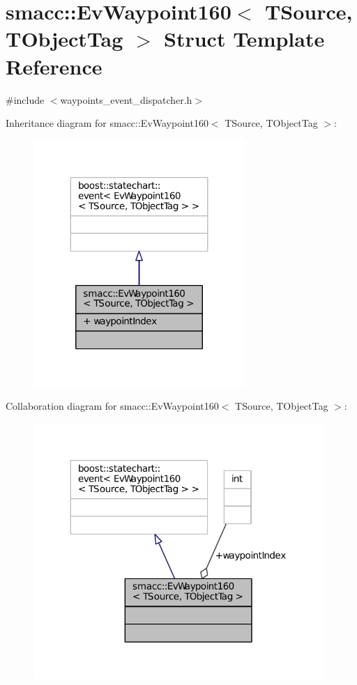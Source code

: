 \hypertarget{structsmacc_1_1EvWaypoint160}{}\section{smacc\+:\+:Ev\+Waypoint160$<$ T\+Source, T\+Object\+Tag $>$ Struct Template Reference}
\label{structsmacc_1_1EvWaypoint160}


{\ttfamily \#include $<$waypoints\+\_\+event\+\_\+dispatcher.\+h$>$}



Inheritance diagram for smacc\+:\+:Ev\+Waypoint160$<$ T\+Source, T\+Object\+Tag $>$\+:
\nopagebreak
\begin{figure}[H]
\begin{center}
\leavevmode
\includegraphics[width=227pt]{structsmacc_1_1EvWaypoint160__inherit__graph}
\end{center}
\end{figure}


Collaboration diagram for smacc\+:\+:Ev\+Waypoint160$<$ T\+Source, T\+Object\+Tag $>$\+:
\nopagebreak
\begin{figure}[H]
\begin{center}
\leavevmode
\includegraphics[width=312pt]{structsmacc_1_1EvWaypoint160__coll__graph}
\end{center}
\end{figure}
